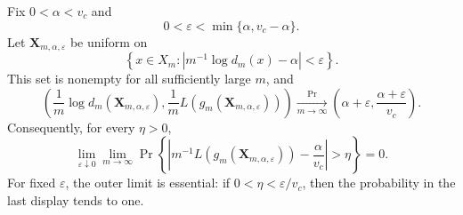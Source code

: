 \ifdefined\supplementonly
\begin{theorem}
\label{thm:conditional-phase-separation}
Fix \(0<\alpha<v_c\) and
\[
 0<\varepsilon<\min\{\alpha,v_c-\alpha\}.
\]
Let \(\mathbf X_{m,\alpha,\varepsilon}\) be uniform on
\[
 \left\{x\in X_m:
 \left|m^{-1}\log d_m(x)-\alpha\right|<\varepsilon\right\}.
\]
This set is nonempty for all sufficiently large \(m\), and
\begin{equation}
 \left(
  \frac1m\log d_m(\mathbf X_{m,\alpha,\varepsilon}),
  \frac1mL(g_m(\mathbf X_{m,\alpha,\varepsilon}))
 \right)
 \xrightarrow[m\to\infty]{\Pr}
 \left(\alpha+\varepsilon,
       \frac{\alpha+\varepsilon}{v_c}\right).
 \label{eq:conditional-phase-separation}
\end{equation}
Consequently, for every \(\eta>0\),
\[
 \lim_{\varepsilon\downarrow0}\lim_{m\to\infty}
 \Pr\left\{
  \left|m^{-1}L(g_m(\mathbf X_{m,\alpha,\varepsilon}))
       -\frac\alpha{v_c}\right|>\eta
 \right\}=0.
\]
For fixed \(\varepsilon\), the outer limit is essential: if
\(0<\eta<\varepsilon/v_c\), then the probability in the last display tends
to one.
\end{theorem}

